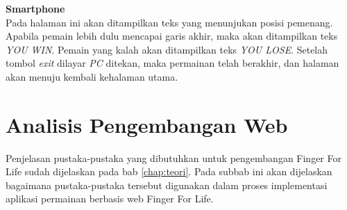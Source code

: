 \begin{enumerate}
	\textbf{Smartphone} \\
	Pada halaman ini akan ditampilkan teks yang menunjukan posisi pemenang. Apabila pemain lebih dulu mencapai garis akhir, maka akan ditampilkan teks \textit{YOU WIN}. Pemain yang kalah akan ditampilkan teks \textit{YOU LOSE}. Setelah tombol \textit{exit} dilayar \textit{PC} ditekan, maka permainan telah berakhir, dan halaman akan menuju kembali kehalaman utama.
	
\end{enumerate}

\section{Analisis Pengembangan Web}
\label{pengembangan}

Penjelasan pustaka-pustaka yang dibutuhkan untuk pengembangan Finger For Life sudah dijelaskan pada bab \ref{chap:teori}. Pada subbab ini akan dijelaskan bagaimana pustaka-pustaka tersebut digunakan dalam proses implementasi aplikasi permainan berbasis web Finger For Life.

